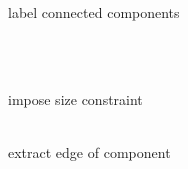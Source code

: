 \documentclass[12pt,a4paper,oneside,openright]{book}
\begin{document}
\begin{CJK}{UTF8}{}
\begin{figure}[htbp]
\begin{center}
\begin{minipage}[t]{.32\textwidth}
\begin{center}
        label connected components
      \end{center}
    \end{minipage}\medskip\\
    \begin{minipage}[t]{.32\textwidth}
      \begin{center}
        \\
        impose size constraint
      \end{center}
    \end{minipage}
    \begin{minipage}[t]{.32\textwidth}
      \begin{center}
        \\
        extract edge of component
      \end{center}
    \end{minipage}
    \begin{minipage}[t]{.32\textwidth}
      \begin{center}
        \\

\end{center}
\end{minipage}
\end{center}
\end{figure}
\end{CJK}
\end{document}
